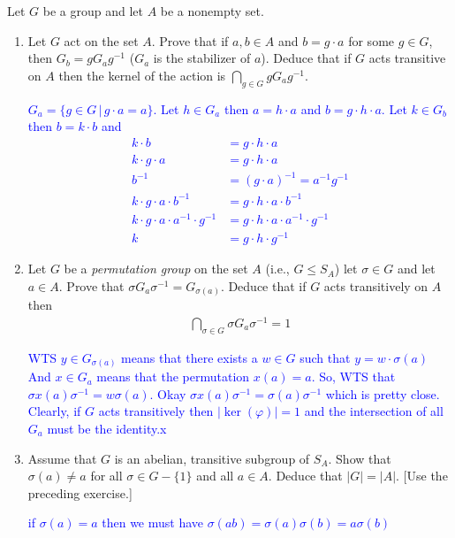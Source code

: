 \documentclass[10pt,a4paper]{report}
\newcommand{\BLUE}[1]{\textcolor{blue}{#1}}
\begin{document}
Let $G$ be a group and let $A$ be a nonempty set.
\begin{enumerate}
	\item Let $G$ act on the set $A$.  Prove that if $a,b \in A$ and $b=g\cdot a$ for some $g \in G$, then $G_b=gG_ag^{-1}$ ($G_a$ is the stabilizer of $a$).  Deduce that if $G$ acts transitive on $A$ then the kernel of the action is $\bigcap_{g\in G}gG_ag^{-1}$.
	
	\BLUE{$G_a = \{g\in G\,|\, g\cdot a =a\}$.  Let $h \in G_a$ then $a = h\cdot a$ and $b=g\cdot h \cdot a$.  Let $k \in G_b$ then $b = k \cdot b$ and
	\begin{align*}
		k \cdot b &= g \cdot h \cdot a \\
		k \cdot g \cdot a &= g \cdot h \cdot a \\
		b^{-1} &= (g \cdot a)^{-1} = a^{-1}g^{-1} \\
		k \cdot g \cdot a \cdot b^{-1} &= g \cdot h \cdot a \cdot b^{-1}\\
		k \cdot g \cdot a \cdot a^{-1} \cdot g^{-1} &= g \cdot h \cdot a \cdot a^{-1} \cdot g^{-1} \\
		k  &= g \cdot h \cdot g^{-1}
\end{align*}	
	}
	
	\item Let $G$ be a \textit{permutation group} on the set $A$ (i.e., $G \le S_A$) let $\sigma \in G$ and let $a \in A$.  Prove that $\sigma G_a \sigma^{-1} = G_{\sigma(a)}$.  Deduce that if $G$ acts transitively on $A$ then 
	\begin{align*}
		\bigcap_{\sigma \in G} \sigma G_a\sigma^{-1} = 1
	\end{align*}
	
	\BLUE{WTS $y \in G_{\sigma(a)}$ means that there exists a $w \in G$ such that $y = w\cdot \sigma(a)$  And $x \in G_a$ means that the permutation $x(a)=a$.  So, WTS that $\sigma x(a) \sigma^{-1} = w\sigma(a)$.  Okay $\sigma x(a) \sigma^{-1} = \sigma(a)\sigma^{-1}$ which is pretty close.\\
	Clearly, if $G$ acts transitively then $|\ker(\varphi)| = 1$ and the intersection of all $G_a$ must be the identity.x
	}

	\item Assume that $G$ is an abelian, transitive subgroup of $S_A$.  Show that $\sigma(a) \ne a$ for all $\sigma \in G-\{1\}$ and all $a \in A$.  Deduce that $|G|= |A|$.  [Use the preceding exercise.]	
	
	\BLUE{if $\sigma(a) = a$ then we must have $\sigma(ab)=\sigma(a)\sigma(b) = a\sigma(b)$
	}
	

\end{enumerate}
\end{document}
